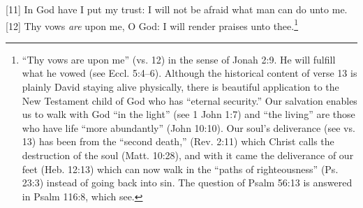 [11] \textcolor[rgb]{0.00,0.00,1.00}{In God have I put my trust: I will not be afraid what man can do unto me.}
[12] \textcolor[rgb]{0.00,0.00,1.00}{Thy vows \emph{are} upon me, O God: I will render praises unto thee.}\footnote{“Thy vows are upon me” (vs. 12) in the sense of Jonah 2:9. He will fulfill what he vowed (see Eccl. 5:4–6). Although the historical content of verse 13 is plainly David staying alive physically, there is beautiful application to the New Testament child of God who has “eternal security.” Our salvation enables us to walk with God “in the light” (see 1 John 1:7) and “the living” are those who have life “more abundantly” (John 10:10). Our soul’s deliverance (see vs. 13) has been from the “second death,” (Rev. 2:11) which Christ calls the destruction of the soul (Matt. 10:28), and with it came the deliverance of our feet (Heb. 12:13) which can now walk in the “paths of righteousness” (Ps. 23:3) instead of going back into sin. The question of Psalm 56:13 is answered in Psalm 116:8, which see.}
